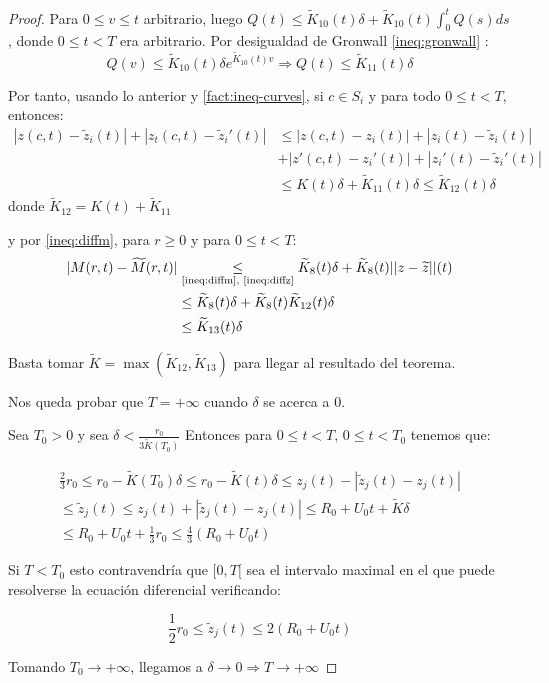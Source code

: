 \documentclass[a4paper,10pt]{scrartcl}
\theoremstyle{definition}
\newcommand{\ktilde}{\widetilde{K}}
\numberwithin{equation}{section}
\begin{document}
\begin{proof}
Para $0\le v\le t$ arbitrario, luego $Q(t) \le \ktilde_{10}(t)\delta + \ktilde_{10}(t) \int_0^{t} Q(s) ds$, donde $0\le t < T$ era arbitrario. Por desigualdad de Gronwall \ref{ineq:gronwall} :
\[
Q(v) \le \ktilde_{10}(t) \delta e^{\ktilde_{10}(t) v} \Rightarrow Q(t) \le \ktilde_{11}(t) \delta
\]

Por tanto, usando lo anterior y \cref{fact:ineq-curves}, si $c\in S_i$ y para todo $0\le t < T$, entonces:
\begin{align}
 |z(c,t) - \widetilde{z}_i(t)| + |z_t(c,t) - \widetilde{z}_i'(t)| &\le 
 |z(c,t) - z_i(t)| + |z_i(t) - \widetilde{z}_i(t)| \nonumber\\
 &+ |z'(c,t) - z_i'(t)| + |z_i'(t) - \widetilde{z}_i'(t)| \nonumber\\
 &\le K(t)\delta +\widetilde{K}_{11}(t)\delta \le \widetilde{K}_{12}(t) \delta \label{ineq:diffz}
\end{align}
donde $\widetilde{K}_{12} = K(t) + \widetilde{K}_{11}$

y por \eqref{ineq:diffm}, para $r\ge 0$ y para $0\le t < T$:
\begin{align*}
 |M(r,t) - \widetilde{M}(r,t)| &\underset{\textrm{\eqref{ineq:diffm}, \eqref{ineq:diffz}}}{\le} \widetilde{K}_{8}(t) \delta + \ktilde_{8}(t) ||z-\widetilde{z}||(t) \\
 &\le \ktilde_8(t)\delta + \ktilde_8(t)\ktilde_{12}(t) \delta \\
 &\le \ktilde_{13}(t)\delta
\end{align*}

Basta tomar $\ktilde = \max(\ktilde_{12}, \ktilde_{13})$ para llegar al resultado del teorema.

Nos queda probar que $T = + \infty$ cuando $\delta$ se acerca a $0$.

Sea $T_0 > 0$ y sea $\delta < \frac{r_0}{3 \ktilde(T_0)}$
Entonces para $0 \le t < T$, $0 \le t < T_0$ tenemos que:

\begin{align*}
\frac{2}{3}r_0 \le r_0 - \ktilde(T_0) \delta \le r_0 - \ktilde(t) \delta \le z_j(t) - |\widetilde{z}_j(t) - z_j(t)| \\
\le \widetilde{z}_j(t) \le z_j(t) + |\widetilde{z}_j(t) - z_j(t)|
\le R_0 + U_0t + \ktilde \delta \\
\le R_0 + U_0t + \frac{1}{3}r_0 \le \frac{4}{3}(R_0 + U_0t)
\end{align*}

Si $T < T_0$ esto contravendría que $[0,T[$ sea el intervalo maximal en el que puede resolverse la ecuación diferencial verificando:

\[
\frac{1}{2}r_0 \le \widetilde{z}_j(t) \le 2(R_0 + U_0t)
\]

Tomando $T_0 \rightarrow +\infty$, llegamos a $\delta \rightarrow 0 \Rightarrow T\rightarrow +\infty$
\end{proof}
\end{document}
